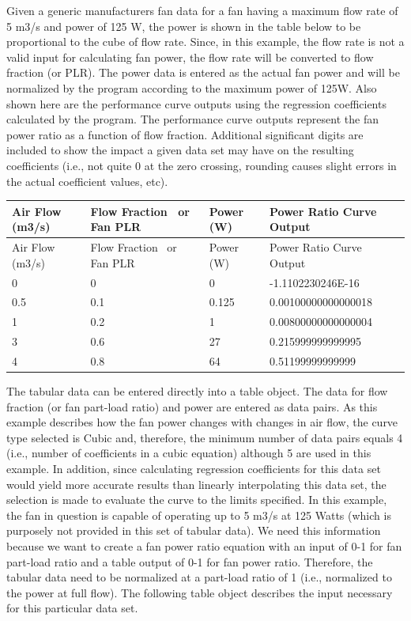 Given a generic manufacturers fan data for a fan having a maximum flow rate of 5 m3/s and power of 125 W, the power is shown in the table below to be proportional to the cube of flow rate. Since, in this example, the flow rate is not a valid input for calculating fan power, the flow rate will be converted to flow fraction (or PLR). The power data is entered as the actual fan power and will be normalized by the program according to the maximum power of 125W. Also shown here are the performance curve outputs using the regression coefficients calculated by the program. The performance curve outputs represent the fan power ratio as a function of flow fraction. Additional significant digits are included to show the impact a given data set may have on the resulting coefficients (i.e., not quite 0 at the zero crossing, rounding causes slight errors in the actual coefficient values, etc).

\begin{longtable}[c]{p{1.5in}p{1.5in}p{1.2in}p{1.8in}}
\toprule 
Air Flow (m3/s) & Flow Fraction~ or Fan PLR & Power (W) & Power Ratio Curve Output \tabularnewline
\midrule
\endfirsthead

\toprule
Air Flow (m3/s) & Flow Fraction~ or Fan PLR & Power (W) & Power Ratio Curve Output \tabularnewline
\midrule
\endhead

0 & 0 & 0 & -1.1102230246E-16 \tabularnewline
0.5 & 0.1 & 0.125 & 0.00100000000000018 \tabularnewline
1 & 0.2 & 1 & 0.00800000000000004 \tabularnewline
3 & 0.6 & 27 & 0.215999999999995 \tabularnewline
4 & 0.8 & 64 & 0.51199999999999 \tabularnewline
\bottomrule
\end{longtable}

The tabular data can be entered directly into a table object. The data for flow fraction (or fan part-load ratio) and power are entered as data pairs. As this example describes how the fan power changes with changes in air flow, the curve type selected is Cubic and, therefore, the minimum number of data pairs equals 4 (i.e., number of coefficients in a cubic equation) although 5 are used in this example. In addition, since calculating regression coefficients for this data set would yield more accurate results than linearly interpolating this data set, the selection is made to evaluate the curve to the limits specified. In this example, the fan in question is capable of operating up to 5 m3/s at 125 Watts (which is purposely not provided in this set of tabular data). We need this information because we want to create a fan power ratio equation with an input of 0-1 for fan part-load ratio and a table output of 0-1 for fan power ratio. Therefore, the tabular data need to be normalized at a part-load ratio of 1 (i.e., normalized to the power at full flow). The following table object describes the input necessary for this particular data set.

